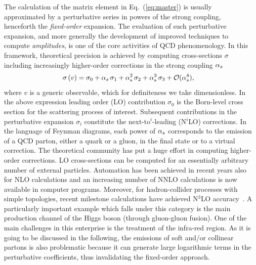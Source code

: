 The calculation of the matrix element in Eq.~(\ref{eq:master}) is
usually approximated by a perturbative series in powers of the strong
coupling, henceforth the \emph{fixed-order} expansion. The evaluation
of such perturbative expansion, and more generally the development of improved
techniques to compute {\em amplitudes}, is one of the core activities of QCD phenomenology. 
%
In this framework, theoretical precision is achieved by computing cross-sections $\sigma$ including increasingly higher-order corrections in the strong coupling $\alpha_s$
\begin{equation} \label{fixedorder_sigma}
\sigma\left(v\right) = \sigma_0 + \alpha_s \, \sigma_1 +\alpha_s^2 \, \sigma_2 +\alpha_s^3 \, \sigma_3 + \mathcal{O}(\alpha_s^4),
\end{equation}
where $v$ is a generic observable, which for definiteness we take dimensionless. In the above expression leading order (LO) contribution $\sigma_0$ is the Born-level cross section for the scattering process of interest. Subsequent contributions in the perturbative expansion $\sigma_i$ constitute the next-to$^i$-leading (N$^i$LO) corrections. In the language of Feynman diagrams, each power of $\alpha_s$ corresponds to the emission of a QCD parton, either a quark or a gluon, in the final state or to a virtual correction. 
%
The theoretical community has put a huge effort in computing higher-order corrections. LO cross-sections can be computed for an essentially arbitrary number of external particles. Automation has been achieved in recent years also for NLO calculations and an increasing number of NNLO calculations is now available in computer programs. 
%
Moreover, for hadron-collider processes with simple topologies, recent
milestone calculations have achieved N$^3$LO
accuracy~\cite{Anastasiou:2015ema,Dreyer:2016oyx}. A particularly
important example which  falls under this category is the main
production channel of the Higgs boson (through gluon-gluon fusion).
%
One of the main challenges in this enterprise is the treatment of the infra-red region. As it is going to be discussed in the following, the emissions of soft and/or collinear partons is also problematic because it can generate large logarithmic terms in the perturbative coefficients, thus invalidating the fixed-order approach.

